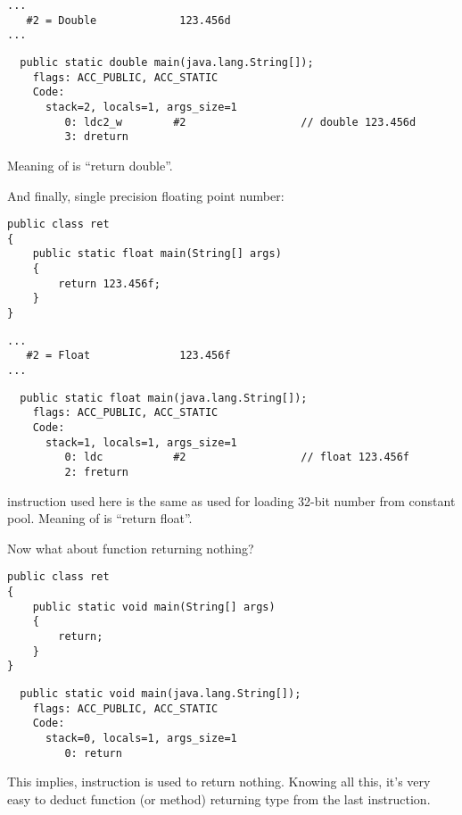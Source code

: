 \begin{lstlisting}[caption=Constant pool]
...
   #2 = Double             123.456d
...
\end{lstlisting}

\begin{lstlisting}
  public static double main(java.lang.String[]);
    flags: ACC_PUBLIC, ACC_STATIC
    Code:
      stack=2, locals=1, args_size=1
         0: ldc2_w        #2                  // double 123.456d
         3: dreturn       
\end{lstlisting}

Meaning of  is ``return double''.

And finally, single precision floating point number:

\begin{lstlisting}
public class ret
{
	public static float main(String[] args)
	{
		return 123.456f;
	}
}
\end{lstlisting}

\begin{lstlisting}[caption=Constant pool]
...
   #2 = Float              123.456f
...
\end{lstlisting}

\begin{lstlisting}
  public static float main(java.lang.String[]);
    flags: ACC_PUBLIC, ACC_STATIC
    Code:
      stack=1, locals=1, args_size=1
         0: ldc           #2                  // float 123.456f
         2: freturn       
\end{lstlisting}

 instruction used here is the same as used for loading 32-bit number from constant pool.
Meaning of  is ``return float''.

Now what about function returning nothing?

\begin{lstlisting}
public class ret
{
	public static void main(String[] args) 
	{
		return;
	}
}
\end{lstlisting}

\begin{lstlisting}
  public static void main(java.lang.String[]);
    flags: ACC_PUBLIC, ACC_STATIC
    Code:
      stack=0, locals=1, args_size=1
         0: return        
\end{lstlisting}

This implies,  instruction is used to return nothing.
Knowing all this, it's very easy to deduct function (or method) returning type 
from the last instruction.
